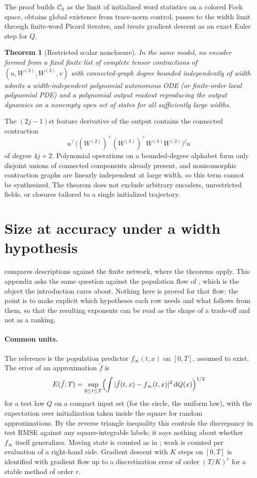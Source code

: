 \documentclass[11pt]{article}
\newtheorem{theorem}{Theorem}[section]
\theoremstyle{definition}
\theoremstyle{remark}
\newcommand{\dd}{\,\mathrm{d}}
\begin{document}
The proof builds $\mathcal C_0$ as the limit of initialized word statistics on a
colored Fock space, obtains global existence from trace-norm control, passes to
the width limit through finite-word Picard iterates, and treats gradient descent
as an exact Euler step for $Q$.

\begin{theorem}[Restricted scalar nonclosure]
\label{thm:nonclosure}
In the same model, no encoder formed from a fixed finite list of complete tensor
contractions of $(u,W^{(2)},W^{(3)},v)$ with connected-graph degree bounded
independently of width admits a width-independent polynomial autonomous ODE (or
finite-order local polynomial PDE) and a polynomial output readout reproducing
the output dynamics on a nonempty open set of states for all sufficiently large
widths.
\end{theorem}

The $(2j-1)$st feature derivative of the output contains the connected
contraction
\[
 u^\top\bigl((W^{(2)})^\top(W^{(3)})^\top W^{(3)}W^{(2)}\bigr)^ju
\]
of degree $4j+2$.  Polynomial operations on a bounded-degree alphabet form only
disjoint unions of connected components already present, and nonisomorphic
contraction graphs are linearly independent at large width, so this term cannot
be synthesized.  The theorem does not exclude arbitrary encoders, unrestricted
fields, or closures tailored to a single initialized trajectory.

\section{Size at accuracy under a width hypothesis}
\label{app:size}

 compares descriptions against the finite network, where the
theorems apply.  This appendix asks the same question against the population
flow of , which is the object the introduction cares about.
Nothing here is proved for that flow; the point is to make explicit which
hypotheses each row needs and what follows from them, so that the resulting
exponents can be read as the shape of a trade-off and not as a ranking.

\paragraph{Common units.}
The reference is the population predictor $f_\infty(t,x)$ on $[0,T]$, assumed
to exist.  The error of an approximation $\tilde f$ is
\[
 E(\tilde f;T)=\sup_{0\le t\le T}\Bigl(\int|\tilde f(t,x)-f_\infty(t,x)|^2\dd Q(x)\Bigr)^{1/2}
\]
for a test law $Q$ on a compact input set (for the circle, the uniform law),
with the expectation over initialization taken inside the square for random
approximations.  By the reverse triangle inequality this controls the
discrepancy in test RMSE against any square-integrable labels; it says nothing
about whether $f_\infty$ itself generalizes.  Moving state is counted as in
; work is counted per evaluation of a right-hand side.  Gradient
descent with $K$ steps on $[0,T]$ is identified with gradient flow up to a
discretization error of order $(T/K)^r$ for a stable method of order $r$.
\end{document}
